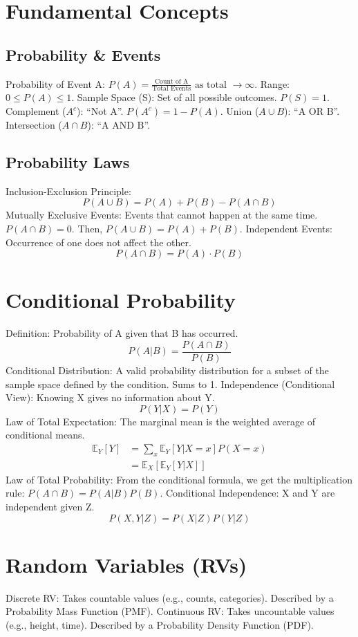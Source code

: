 \documentclass[8pt]{article}
\begin{document}
\pagestyle{empty} %
\begin{multicols}{3}
\section*{Fundamental Concepts}
\subsection*{Probability \& Events}
Probability of Event A: $P(A) = \frac{\text{Count of A}}{\text{Total Events}} \text{ as total } \to \infty$.
Range: $0 \le P(A) \le 1$.
Sample Space (S): Set of all possible outcomes. $P(S)=1$.
Complement ($A^c$): “Not A”. $P(A^c) = 1 - P(A)$.
Union ($A \cup B$): “A OR B”.
Intersection ($A \cap B$): “A AND B”.
\subsection*{Probability Laws}
Inclusion-Exclusion Principle:
$$P(A \cup B) = P(A) + P(B) - P(A \cap B)$$
Mutually Exclusive Events: Events that cannot happen at the same time. $P(A \cap B) = 0$. Then, $P(A \cup B) = P(A) + P(B)$.
Independent Events: Occurrence of one does not affect the other.
$$P(A \cap B) = P(A) \cdot P(B)$$
\section*{Conditional Probability}
Definition: Probability of A given that B has occurred.
$$P(A|B) = \frac{P(A \cap B)}{P(B)}$$
Conditional Distribution: A valid probability distribution for a subset of the sample space defined by the condition. Sums to 1.
Independence (Conditional View): Knowing X gives no information about Y.
$$P(Y|X) = P(Y)$$
Law of Total Expectation: The marginal mean is the weighted average of conditional means.
\begin{align*}
\mathbb{E}_{Y}[Y] &= \sum_{x} \mathbb{E}_{Y}[Y|X=x] P(X=x) \\
                 &= \mathbb{E}_{X}[\mathbb{E}_{Y}[Y|X]]
\end{align*}
Law of Total Probability: From the conditional formula, we get the multiplication rule: $P(A \cap B) = P(A|B)P(B)$.
Conditional Independence: X and Y are independent given Z.
$$P(X,Y|Z) = P(X|Z)P(Y|Z)$$
\section*{Random Variables (RVs)}
Discrete RV: Takes countable values (e.g., counts, categories). Described by a Probability Mass Function (PMF).
Continuous RV: Takes uncountable values (e.g., height, time). Described by a Probability Density Function (PDF).

\end{multicols}
\end{document}
